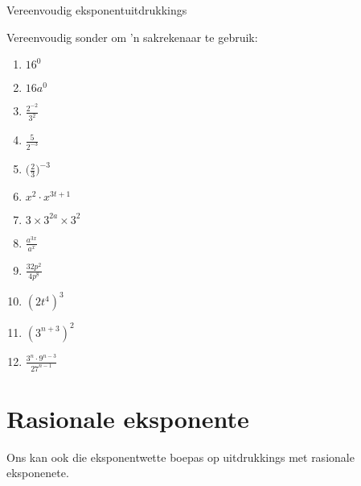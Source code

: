 \begin{exercises}{Vereenvoudig eksponentuitdrukkings}
{
Vereenvoudig sonder om ’n sakrekenaar te gebruik:
\begin{multicols}{2}
\begin{enumerate}[noitemsep, label=\textbf{\arabic*}., itemsep=5pt]
 \item $16^0$
 \item $16a^0$
 \item $\frac{2^{-2}}{3^2}$
 \item $ \frac{5}{2^{-3}}$
 \item $ \Big(\frac{2}{3}\Big)^{-3} $
 \item $ x^2 \cdot x^{3t+1} $
 \item $ 3 \times 3^{2a} \times 3^2$
 \item $ \frac{a^{3x}}{a^x} $
 \item $ \frac{32p^2}{4p^8}$
 \item $ (2t^4)^3$
 \item $ (3^{n+3})^2$
 \item $ \frac{3^n \cdot 9^{n-3}}{27^{n-1}}$
\end{enumerate}
\end{multicols}

 

}
\end{exercises}




\section{Rasionale eksponente}

Ons kan ook die eksponentwette boepas op uitdrukkings met rasionale eksponenete.


